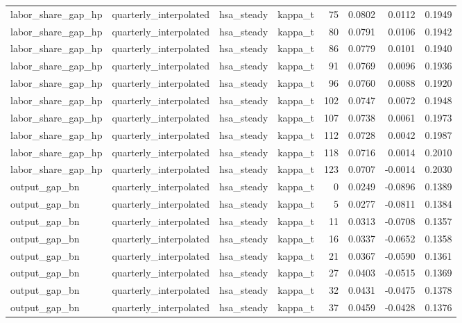 \begin{tabular}{llllrrrr}
labor\_share\_gap\_hp & quarterly\_interpolated & hsa\_steady & kappa\_t & 75 & 0.0802 & 0.0112 & 0.1949 \\
labor\_share\_gap\_hp & quarterly\_interpolated & hsa\_steady & kappa\_t & 80 & 0.0791 & 0.0106 & 0.1942 \\
labor\_share\_gap\_hp & quarterly\_interpolated & hsa\_steady & kappa\_t & 86 & 0.0779 & 0.0101 & 0.1940 \\
labor\_share\_gap\_hp & quarterly\_interpolated & hsa\_steady & kappa\_t & 91 & 0.0769 & 0.0096 & 0.1936 \\
labor\_share\_gap\_hp & quarterly\_interpolated & hsa\_steady & kappa\_t & 96 & 0.0760 & 0.0088 & 0.1920 \\
labor\_share\_gap\_hp & quarterly\_interpolated & hsa\_steady & kappa\_t & 102 & 0.0747 & 0.0072 & 0.1948 \\
labor\_share\_gap\_hp & quarterly\_interpolated & hsa\_steady & kappa\_t & 107 & 0.0738 & 0.0061 & 0.1973 \\
labor\_share\_gap\_hp & quarterly\_interpolated & hsa\_steady & kappa\_t & 112 & 0.0728 & 0.0042 & 0.1987 \\
labor\_share\_gap\_hp & quarterly\_interpolated & hsa\_steady & kappa\_t & 118 & 0.0716 & 0.0014 & 0.2010 \\
labor\_share\_gap\_hp & quarterly\_interpolated & hsa\_steady & kappa\_t & 123 & 0.0707 & -0.0014 & 0.2030 \\
output\_gap\_bn & quarterly\_interpolated & hsa\_steady & kappa\_t & 0 & 0.0249 & -0.0896 & 0.1389 \\
output\_gap\_bn & quarterly\_interpolated & hsa\_steady & kappa\_t & 5 & 0.0277 & -0.0811 & 0.1384 \\
output\_gap\_bn & quarterly\_interpolated & hsa\_steady & kappa\_t & 11 & 0.0313 & -0.0708 & 0.1357 \\
output\_gap\_bn & quarterly\_interpolated & hsa\_steady & kappa\_t & 16 & 0.0337 & -0.0652 & 0.1358 \\
output\_gap\_bn & quarterly\_interpolated & hsa\_steady & kappa\_t & 21 & 0.0367 & -0.0590 & 0.1361 \\
output\_gap\_bn & quarterly\_interpolated & hsa\_steady & kappa\_t & 27 & 0.0403 & -0.0515 & 0.1369 \\
output\_gap\_bn & quarterly\_interpolated & hsa\_steady & kappa\_t & 32 & 0.0431 & -0.0475 & 0.1378 \\
output\_gap\_bn & quarterly\_interpolated & hsa\_steady & kappa\_t & 37 & 0.0459 & -0.0428 & 0.1376 \\

\end{tabular}
